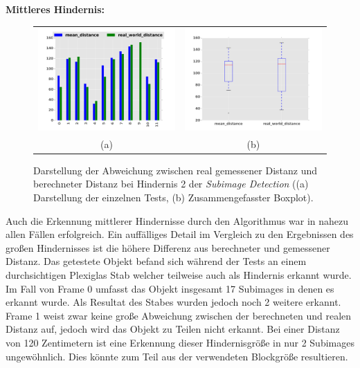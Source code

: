 \noindent
\textbf{Mittleres Hindernis:}\\
\begin{figure}[h]
	\centering
	\begin{tabular}{cc}
	\includegraphics[width=7cm]{img/evaluation/diagrams/sub_medium_bar}&
	\includegraphics[width=7cm]{img/evaluation/diagrams/sub_medium_box}\\
	(a) &  (b)
	\end{tabular}
	\caption{Darstellung der Abweichung zwischen real gemessener Distanz und berechneter Distanz bei Hindernis 2 der \emph{Subimage Detection} ((a) Darstellung der einzelnen Tests, (b) Zusammengefasster Boxplot).}
    \label{fig:eval_medium}
\end{figure}

\noindent
Auch die Erkennung mittlerer Hindernisse durch den Algorithmus war in nahezu allen Fällen erfolgreich. Ein auffälliges Detail im Vergleich zu den Ergebnissen des großen Hindernisses ist die höhere Differenz aus berechneter und gemessener Distanz. Das getestete Objekt befand sich während der Tests an einem durchsichtigen Plexiglas Stab welcher teilweise auch als Hindernis erkannt wurde. Im Fall von Frame 0 umfasst das Objekt insgesamt 17 Subimages in denen es erkannt wurde. Als Resultat des Stabes wurden jedoch noch 2 weitere erkannt. Frame 1 weist zwar keine große Abweichung zwischen der berechneten und realen Distanz auf, jedoch wird das Objekt zu Teilen nicht erkannt. Bei einer Distanz von 120 Zentimetern ist eine Erkennung dieser Hindernisgröße in nur 2 Subimages ungewöhnlich. Dies könnte zum Teil aus der verwendeten Blockgröße resultieren.

